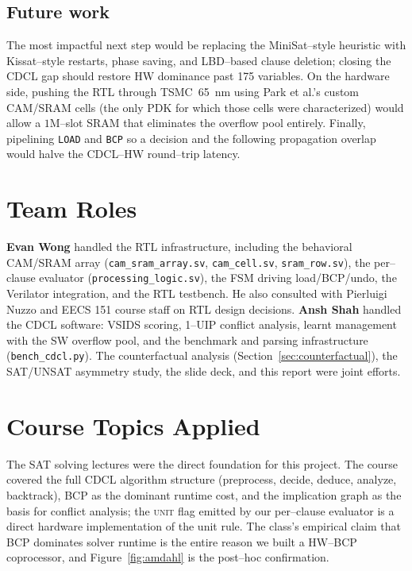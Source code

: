 \documentclass[11pt,letterpaper]{article}
\begin{document}
\subsection{Future work}
The most impactful next step would be replacing the MiniSat--style
heuristic with Kissat--style restarts, phase saving, and LBD--based
clause deletion; closing the CDCL gap should restore HW dominance
past 175 variables. On the hardware side, pushing the RTL through
TSMC~65~nm using Park et al.'s custom CAM/SRAM cells (the only PDK
for which those cells were characterized) would allow a $1$M--slot
SRAM that eliminates the overflow pool entirely. Finally, pipelining
\texttt{LOAD} and \texttt{BCP} so a decision and the following
propagation overlap would halve the CDCL--HW round--trip latency.

\section{Team Roles}
\textbf{Evan Wong} handled the RTL infrastructure, including the
behavioral CAM/SRAM array (\texttt{cam\_sram\_array.sv},
\texttt{cam\_cell.sv}, \texttt{sram\_row.sv}), the per--clause
evaluator (\texttt{processing\_logic.sv}), the FSM driving
load/BCP/undo, the Verilator integration, and the RTL testbench.
He also consulted with Pierluigi Nuzzo and EECS 151 course staff
on RTL design decisions. \textbf{Ansh Shah} handled the CDCL
software: VSIDS scoring, 1--UIP conflict analysis, learnt management
with the SW overflow pool, and the benchmark and parsing
infrastructure (\texttt{bench\_cdcl.py}). The counterfactual
analysis (Section~\ref{sec:counterfactual}), the SAT/UNSAT asymmetry
study, the slide deck, and this report were joint efforts.

\section{Course Topics Applied}
The SAT solving lectures were the direct foundation for this project.
The course covered the full CDCL algorithm structure (preprocess,
decide, deduce, analyze, backtrack), BCP as the dominant runtime
cost, and the implication graph as the basis for conflict analysis;
the \textsc{unit} flag emitted by our per--clause evaluator is a
direct hardware implementation of the unit rule. The class's
empirical claim that BCP dominates solver runtime is the entire
reason we built a HW--BCP coprocessor, and Figure~\ref{fig:amdahl}
is the post--hoc confirmation.
\end{document}
